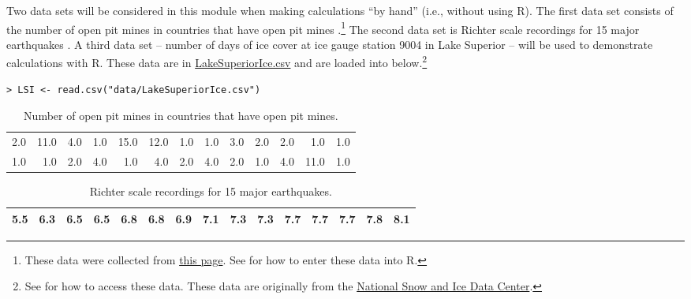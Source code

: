 \documentclass[10pt,openany]{book}\usepackage[]{graphicx}\usepackage[]{color}
\makeatletter
\newenvironment{kframe}{%
 \def\at@end@of@kframe{}%
 \ifinner\ifhmode%
  \def\at@end@of@kframe{\end{minipage}}%
  \begin{minipage}{\columnwidth}%
 \fi\fi%
 \def\FrameCommand##1{\hskip\@totalleftmargin \hskip-\fboxsep
 \colorbox{shadecolor}{##1}\hskip-\fboxsep
     \hskip-\linewidth \hskip-\@totalleftmargin \hskip\columnwidth}%
 \MakeFramed {\advance\hsize-\width
   \@totalleftmargin\z@ \linewidth\hsize
   \@setminipage}}%
 {\par\unskip\endMakeFramed%
 \at@end@of@kframe}
\newenvironment{knitrout}{}{} %
\makeatother
\begin{document}
Two data sets will be considered in this module when making calculations ``by hand'' (i.e., without using R). The first data set consists of the number of open pit mines in countries that have open pit mines .\footnote{These data were collected from \href{https://en.wikipedia.org/wiki/List_of_open-pit_mines}{this page}. See  for how to enter these data into R.} The second data set is Richter scale recordings for 15 major earthquakes . A third data set -- number of days of ice cover at ice gauge station 9004 in Lake Superior -- will be used to demonstrate calculations with R. These data are in \href{https://raw.githubusercontent.com/droglenc/NCData/master/LakeSuperiorIce.csv}{LakeSuperiorIce.csv} and are loaded into  below.\footnote{See  for how to access these data. These data are originally from the \href{http://www.nsidc.org/}{National Snow and Ice Data Center}.}
\begin{knitrout}
\color{fgcolor}\begin{kframe}
\begin{verbatim}
> LSI <- read.csv("data/LakeSuperiorIce.csv")
\end{verbatim}
\end{kframe}
\end{knitrout}


\begin{table}[ht]
\centering
\caption{Number of open pit mines in countries that have open pit mines.} 
\label{tab:MineData}
\begin{tabular}{rrrrrrrrrrrrr}
   \hline
2.0 & 11.0 & 4.0 & 1.0 & 15.0 & 12.0 & 1.0 & 1.0 & 3.0 & 2.0 & 2.0 & 1.0 & 1.0 \\ 
  1.0 & 1.0 & 2.0 & 4.0 & 1.0 & 4.0 & 2.0 & 4.0 & 2.0 & 1.0 & 4.0 & 11.0 & 1.0 \\ 
   \hline
\end{tabular}
\end{table}


\begin{table}[ht]
\centering
\caption{Richter scale recordings for 15 major earthquakes.} 
\label{tab:EQData}
\begin{tabular}{rrrrrrrrrrrrrrr}
   \hline
5.5 & 6.3 & 6.5 & 6.5 & 6.8 & 6.8 & 6.9 & 7.1 & 7.3 & 7.3 & 7.7 & 7.7 & 7.7 & 7.8 & 8.1 \\ 
   \hline
\end{tabular}
\end{table}
\end{document}

